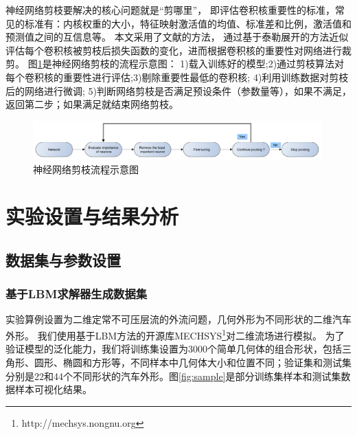 神经网络剪枝要解决的核心问题就是“剪哪里”，
即评估卷积核重要性的标准，常见的标准有：内核权重的大小，特征映射激活值的均值、标准差和比例，激活值和预测值之间的互信息等。
本文采用了文献\cite{DBLP:conf/iclr/MolchanovTKAK17}的方法，
通过基于泰勒展开的方法近似评估每个卷积核被剪枝后损失函数的变化，进而根据卷积核的重要性对网络进行裁剪。
图\ref{fig:pruning}是神经网络剪枝的流程示意图：
1)载入训练好的模型;2)通过剪枝算法对每个卷积核的重要性进行评估;3)剔除重要性最低的卷积核;
4)利用训练数据对剪枝后的网络进行微调;
5)判断网络剪枝是否满足预设条件（参数量等），如果不满足，返回第二步；如果满足就结束网络剪枝。
 

\begin{figure}[htp]
	\centering
	\includegraphics[width=0.99\textwidth]{figures/pruning_flow.pdf}
	\caption{神经网络剪枝流程示意图}
	\label{fig:pruning}
\end{figure}



\section{实验设置与结果分析}

\subsection{数据集与参数设置}

\subsubsection{基于LBM求解器生成数据集}
实验算例设置为二维定常不可压层流的外流问题，几何外形为不同形状的二维汽车外形。
我们使用基于LBM方法的开源库MECHSYS\footnote{ http://mechsys.nongnu.org}对二维流场进行模拟。
为了验证模型的泛化能力，我们将训练集设置为3000个简单几何体的组合形状，包括三角形、圆形、椭圆和方形等，不同样本中几何体大小和位置不同；验证集和测试集分别是22和44个不同形状的汽车外形。图\ref{fig:sample}是部分训练集样本和测试集数据样本可视化结果。

